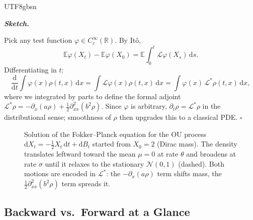 \documentclass{article}
\newenvironment{proof}[1][Proof]{%
  \par\smallskip\noindent\textit{\textbf{#1.}}\quad\ignorespaces
}{%
  \hfill$\square$\par\smallskip
}
\begin{document}
\begin{CJK*}{UTF8}{gbsn}
\begin{proof}[Sketch]
Pick any test function $\varphi\in C_c^\infty(\mathbb{R})$. By It\^o,
\[
  \mathbb{E}\varphi(X_t)-\mathbb{E}\varphi(X_0)=\mathbb{E}\!\int_0^t\mathcal{L}\varphi(X_s)\,\mathrm{d}s.
\]
Differentiating in $t$:
\[
  \frac{\mathrm{d}}{\mathrm{d}t}\!\int\varphi(x)\rho(t,x)\,\mathrm{d}x=\int\mathcal{L}\varphi(x)\rho(t,x)\,\mathrm{d}x=\int\varphi(x)\,\mathcal{L}^*\rho(t,x)\,\mathrm{d}x,
\]
where we integrated by parts to define the formal adjoint $\mathcal{L}^*\rho=-\partial_x(a\rho)+\tfrac{1}{2}\partial_{xx}^2(b^2\rho)$. Since $\varphi$ is arbitrary, $\partial_t\rho=\mathcal{L}^*\rho$ in the distributional sense; smoothness of $\rho$ then upgrades this to a classical PDE.
\end{proof}

\begin{figure}[h]
\centering
{}
\caption{Solution of the Fokker--Planck equation for the OU process $\mathrm{d}X_t=-\tfrac{1}{2}X_t\,\mathrm{d}t+\mathrm{d}B_t$ started from $X_0=2$ (Dirac mass). The density translates leftward toward the mean $\mu=0$ at rate $\theta$ and broadens at rate $\sigma$ until it relaxes to the stationary $\mathcal{N}(0,1)$ (dashed). Both motions are encoded in $\mathcal{L}^*$: the $-\partial_x(a\rho)$ term shifts mass, the $\tfrac12\partial^2_{xx}(b^2\rho)$ term spreads it.}
\label{fig:fpe}
\end{figure}

\subsection{Backward vs.\ Forward at a Glance}


\end{CJK*}
\end{document}
